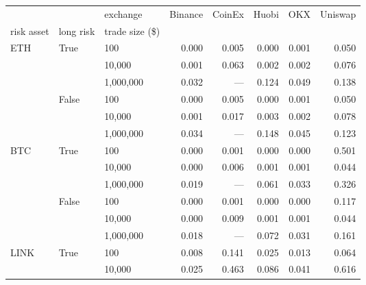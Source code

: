 \begin{tabular}{lllrrrrr}
    \toprule
                          &                        & exchange        & Binance & CoinEx & Huobi & OKX   & Uniswap \\
    risk asset            & long risk              & trade size (\$) &         &        &       &       &         \\
    \midrule
    \multirow{6}{*}{ETH}  & \multirow{3}{*}{True}  & 100             & 0.000   & 0.005  & 0.000 & 0.001 & 0.050   \\
                          &                        & 10,000          & 0.001   & 0.063  & 0.002 & 0.002 & 0.076   \\
                          &                        & 1,000,000       & 0.032   & ---    & 0.124 & 0.049 & 0.138   \\
    \cline{2-8}
                          & \multirow{3}{*}{False} & 100             & 0.000   & 0.005  & 0.000 & 0.001 & 0.050   \\
                          &                        & 10,000          & 0.001   & 0.017  & 0.003 & 0.002 & 0.078   \\
                          &                        & 1,000,000       & 0.034   & ---    & 0.148 & 0.045 & 0.123   \\
    \cline{1-8}
    \cline{2-8}
    \multirow{6}{*}{BTC}  & \multirow{3}{*}{True}  & 100             & 0.000   & 0.001  & 0.000 & 0.000 & 0.501   \\
                          &                        & 10,000          & 0.000   & 0.006  & 0.001 & 0.001 & 0.044   \\
                          &                        & 1,000,000       & 0.019   & ---    & 0.061 & 0.033 & 0.326   \\
    \cline{2-8}
                          & \multirow{3}{*}{False} & 100             & 0.000   & 0.001  & 0.000 & 0.000 & 0.117   \\
                          &                        & 10,000          & 0.000   & 0.009  & 0.001 & 0.001 & 0.044   \\
                          &                        & 1,000,000       & 0.018   & ---    & 0.072 & 0.031 & 0.161   \\
    \cline{1-8}
    \cline{2-8}
    \multirow{6}{*}{LINK} & \multirow{3}{*}{True}  & 100             & 0.008   & 0.141  & 0.025 & 0.013 & 0.064   \\
                          &                        & 10,000          & 0.025   & 0.463  & 0.086 & 0.041 & 0.616   \\

\end{tabular}
